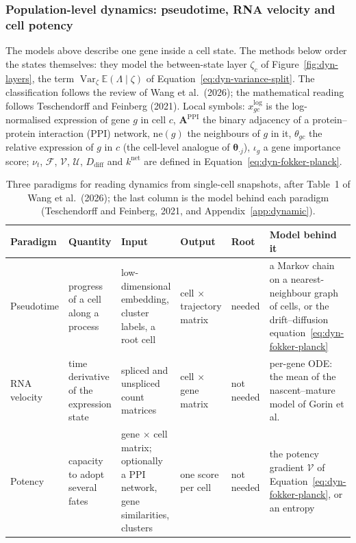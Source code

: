 \subsubsection{Population-level dynamics: pseudotime, RNA velocity and cell potency}
\label{app:dynamic-potency}

The models above describe one gene inside a cell state. The methods below order the states themselves: they model
the between-state layer \(\zeta_{c}\) of Figure~\ref{fig:dyn-layers}, the term \(\operatorname{Var}_{\zeta}\mathbb{E}(\Lambda\mid\zeta)\) of
Equation~\eqref{eq:dyn-variance-split}. The classification follows the review of Wang et al.\ (2026); the
mathematical reading follows Teschendorff and Feinberg (2021). Local symbols: \(x^{\log}_{gc}\) is the
log-normalised expression of gene \(g\) in cell \(c\), \(\boldsymbol{A}^{\mathrm{PPI}}\) the binary adjacency of a
protein--protein interaction (PPI) network, \(\mathrm{ne}(g)\) the neighbours of \(g\) in it, \(\theta_{gc}\) the relative
expression of \(g\) in \(c\) (the cell-level analogue of \(\boldsymbol{\theta}_{\cdot j}\)), \(\iota_{g}\) a gene importance score;
\(\nu_{t}\), \(\mathcal{F}\), \(\mathcal{V}\), \(\mathcal{U}\), \(D_{\mathrm{diff}}\) and \(k^{\mathrm{net}}\) are defined in
Equation~\eqref{eq:dyn-fokker-planck}.

\begin{table}[ht]
  \centering
  \footnotesize
  \caption{Three paradigms for reading dynamics from single-cell snapshots, after Table~1 of Wang et al.\ (2026); the
    last column is the model behind each paradigm (Teschendorff and Feinberg, 2021, and Appendix~\ref{app:dynamic}).}
  \label{tab:dyn-paradigms}
  \begin{tabularx}{\textwidth}{@{}lYYYlY@{}}
    \toprule
    Paradigm & Quantity & Input & Output & Root & Model behind it \\
    \midrule
    Pseudotime & progress of a cell along a process & low-dimensional embedding, cluster labels, a root cell &
      cell \(\times\) trajectory matrix & needed & a Markov chain on a nearest-neighbour graph of cells, or the
      drift--diffusion equation~\eqref{eq:dyn-fokker-planck} \\
    RNA velocity & time derivative of the expression state & spliced and unspliced count matrices &
      cell \(\times\) gene matrix & not needed & per-gene ODE: the mean of the nascent--mature model of Gorin et al. \\
    Potency & capacity to adopt several fates & gene \(\times\) cell matrix; optionally a PPI network, gene similarities,
      clusters & one score per cell & not needed & the potency gradient \(\mathcal{V}\) of
      Equation~\eqref{eq:dyn-fokker-planck}, or an entropy \\
    \bottomrule
  \end{tabularx}
\end{table}

